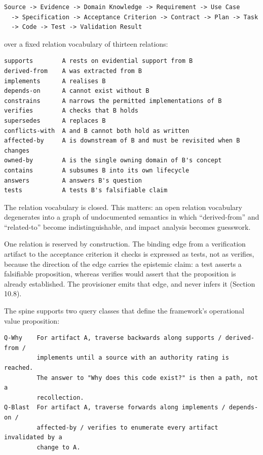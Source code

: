 \documentclass[11pt,a4paper]{article}
\begin{document}
\begin{Verbatim}[fontsize=\footnotesize,breaklines=true,breakanywhere=true,breakautoindent=false,samepage=false]
Source -> Evidence -> Domain Knowledge -> Requirement -> Use Case
  -> Specification -> Acceptance Criterion -> Contract -> Plan -> Task
  -> Code -> Test -> Validation Result
\end{Verbatim}

over a fixed relation vocabulary of thirteen relations:

\begin{Verbatim}[fontsize=\footnotesize,breaklines=true,breakanywhere=true,breakautoindent=false,samepage=false]
supports        A rests on evidential support from B
derived-from    A was extracted from B
implements      A realises B
depends-on      A cannot exist without B
constrains      A narrows the permitted implementations of B
verifies        A checks that B holds
supersedes      A replaces B
conflicts-with  A and B cannot both hold as written
affected-by     A is downstream of B and must be revisited when B changes
owned-by        A is the single owning domain of B's concept
contains        A subsumes B into its own lifecycle
answers         A answers B's question
tests           A tests B's falsifiable claim
\end{Verbatim}

The relation vocabulary is closed. This matters: an open relation vocabulary degenerates into a graph of undocumented semantics in which ``derived-from'' and ``related-to'' become indistinguishable, and impact analysis becomes guesswork.

One relation is reserved by construction. The binding edge from a verification artifact to the acceptance criterion it checks is expressed as tests, not as verifies, because the direction of the edge carries the epistemic claim: a test asserts a falsifiable proposition, whereas verifies would assert that the proposition is already established. The provisioner emits that edge, and never infers it (Section 10.8).

The spine supports two query classes that define the framework's operational value proposition:

\begin{Verbatim}[fontsize=\footnotesize,breaklines=true,breakanywhere=true,breakautoindent=false,samepage=false]
Q-Why    For artifact A, traverse backwards along supports / derived-from /
         implements until a source with an authority rating is reached.
         The answer to "Why does this code exist?" is then a path, not a
         recollection.
Q-Blast  For artifact A, traverse forwards along implements / depends-on /
         affected-by / verifies to enumerate every artifact invalidated by a
         change to A.
\end{Verbatim}
\end{document}
